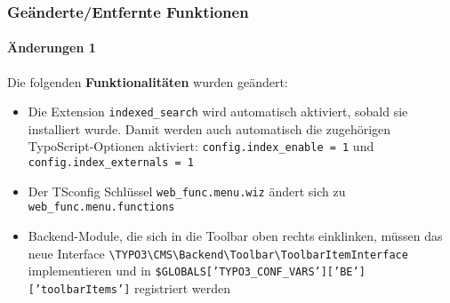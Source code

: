 \begin{frame}[fragile]
	\frametitle{Geänderte/Entfernte Funktionen}
	\framesubtitle{Änderungen 1}

	Die folgenden \textbf{Funktionalitäten} wurden geändert:

	\begin{itemize}

		\item Die Extension \texttt{indexed\_search} wird automatisch aktiviert, sobald sie installiert wurde. Damit werden auch automatisch die zugehörigen TypoScript-Optionen aktiviert: \texttt{config.index\_enable = 1} und \texttt{config.index\_externals = 1} 
		
		\item Der TSconfig Schlüssel \texttt{web\_func.menu.wiz} ändert sich zu \texttt{web\_func.menu.functions}

		\item Backend-Module, die sich in die Toolbar oben rechts einklinken, müssen das neue Interface \lstinline{\TYPO3\CMS\Backend\Toolbar\ToolbarItemInterface} implementieren und in \texttt{\$GLOBALS['TYPO3\_CONF\_VARS']['BE']['toolbarItems']} registriert werden
	\end{itemize}

\end{frame}


